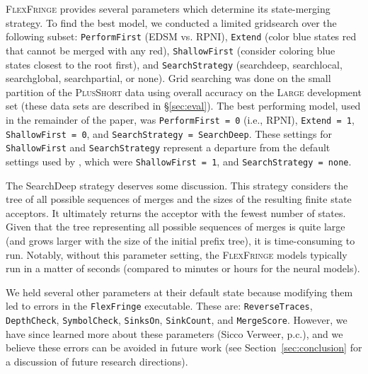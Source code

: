 \documentclass[twoside,11pt]{article}
\newcommand{\tscx}[1]{\textsc{#1}\xspace}
\newcommand{\lrg}{\tscx{Large}}
\begin{document}
\textsc{FlexFringe} provides several parameters which determine its
state-merging strategy.  To find the best model, we conducted a
limited gridsearch over the following subset: \texttt{PerformFirst}
(EDSM vs. RPNI), \texttt{Extend} (color blue states red that cannot be
merged with any red), \texttt{ShallowFirst} (consider coloring blue
states closest to the root first), and \texttt{SearchStrategy}
(searchdeep, searchlocal, searchglobal, searchpartial, or none).  
Grid searching was done on the small partition of the \textsc{PlusShort}
data using overall accuracy on the \lrg development set
(these data sets are described in \S\ref{sec:eval}). 
The best
performing model, used in the remainder of the paper, was
\texttt{PerformFirst = 0} (i.e., RPNI), \texttt{Extend = 1},
\texttt{ShallowFirst = 0}, and \texttt{SearchStrategy = SearchDeep}.
These settings for \texttt{ShallowFirst} and \texttt{SearchStrategy} represent a departure from the default settings used by \citet{adil23}, which were \texttt{ShallowFirst = 1}, and \texttt{SearchStrategy = none}.

The SearchDeep strategy deserves some discussion. 
This strategy considers the tree of all possible sequences of merges and the sizes of the resulting finite state acceptors. 
It ultimately returns the acceptor with the fewest number of states. 
Given that the tree representing all possible sequences of merges is quite large (and grows larger with the size of the initial prefix tree), it is time-consuming to run.
Notably, without this parameter setting, the \textsc{FlexFringe} models typically run in a matter of seconds (compared to minutes or hours for the neural models).

We held several other parameters at their default state because
modifying them led to errors in the \texttt{FlexFringe}
executable. These are: \texttt{ReverseTraces}, \texttt{DepthCheck},
\texttt{SymbolCheck}, \texttt{SinksOn}, \texttt{SinkCount}, and
\texttt{MergeScore}. 
However, we have since learned more about these
parameters (Sicco Verweer, p.c.), and we believe these errors can be avoided in future work (see Section~\ref{sec:conclusion} for a discussion of future research directions).
\end{document}
